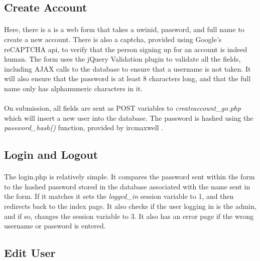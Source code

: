 \documentclass[11pt,letterpaper,titlepage]{article}
\begin{document}
        \subsection{Create Account}
        \paragraph{}
        Here, there is a is a web form that takes a uwinid, password, and full
        name to create a new account. There is also a captcha, provided using
        Google's reCAPTCHA api, to verify that the person signing up for an
        account is indeed human. The form uses the jQuery Validation plugin
        \cite{validate} to validate all the fields, including AJAX calls to the
        database to ensure that a username is not taken. It will also ensure
        that the password is at least 8 characters long, and that the full name
        only has alphanumeric characters in it.

        \paragraph{}
        On submission, all fields are sent as POST variables to
        \emph{createaccount\_go.php} which will insert a new user into the
        database. The password is hashed using the \emph{password\_hash()}
        function, provided by ircmaxwell \cite{password}.

        \subsection{Login and Logout}
        \paragraph{}
        The login.php is relatively simple. It compares the password sent within
        the form to the hashed password stored in the database associated with
        the name sent in the form. If it matches it sets the \emph{logged\_in}
        session variable to 1, and then redirects back to the index page. It
        also checks if the user logging in is the admin, and if so, changes the
        session variable to 3. It also has an error page if the wrong username
        or password is entered.

        \subsection{Edit User}
\end{document}
